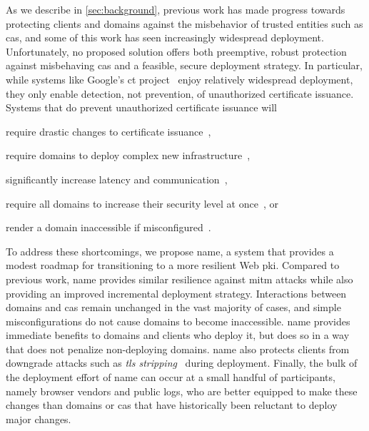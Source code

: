 As we describe in \autoref{sec:background}, previous work has made progress
towards protecting clients and domains against the misbehavior of trusted
entities such as \acp{ca}, and some of this work has seen increasingly
widespread deployment. Unfortunately, no proposed solution offers both
preemptive, robust protection against misbehaving \acp{ca} and a feasible,
secure deployment strategy. In particular, while systems like Google's \ac{ct}
project~\cite{rfc6962,ct-laurie} enjoy relatively widespread deployment, they
only enable detection, not prevention, of unauthorized certificate issuance.
Systems that do prevent unauthorized certificate issuance will
\begin{inparaenum}
\item require drastic changes to certificate issuance~\cite{kim2013accountable},
\item require domains to deploy complex new infrastructure~\cite{rfc6698,
  szalachowski2014policert},
\item significantly increase latency and communication~\cite{yu2016dtki},
\item require all domains to increase their security level at
  once~\cite{basin2014arpki}, or
\item render a domain inaccessible if misconfigured~\cite{palmer2017intent}.
\end{inparaenum}

To address these shortcomings, we propose \ac{name}, a system that provides a
modest roadmap for transitioning to a more resilient Web \ac{pki}. Compared to
previous work, \ac{name} provides similar resilience against \ac{mitm} attacks
while also providing an improved incremental deployment strategy. Interactions
between domains and \acp{ca} remain unchanged in the vast majority of cases, and
simple misconfigurations do not cause domains to become inaccessible. \ac{name}
provides immediate benefits to domains and clients who deploy it, but does so in
a way that does not penalize non-deploying domains. \ac{name} also protects
clients from downgrade attacks such as \emph{\ac{tls}
stripping}~\cite{marlinspike2009new} during deployment. Finally, the bulk of the
deployment effort of \ac{name} can occur at a small handful of participants,
namely browser vendors and public logs, who are better equipped to make these
changes than domains or \acp{ca} that have historically been reluctant to deploy
major changes.

